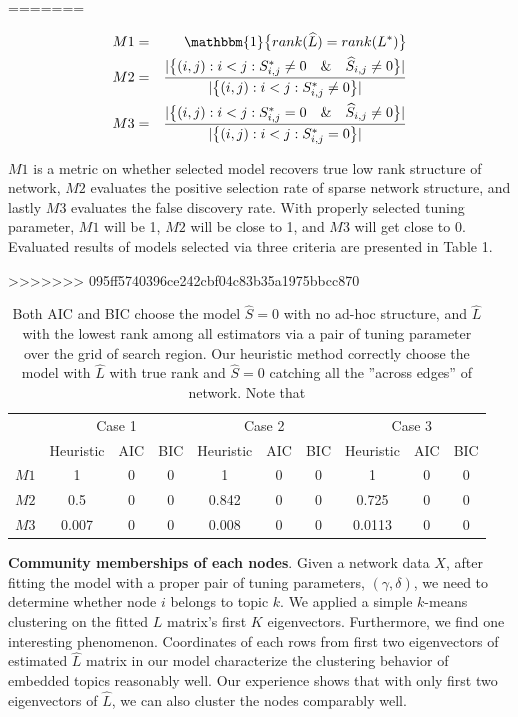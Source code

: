 \documentclass[AMS,STIX1COL]{WileyNJD-v2}
\begin{document}
=======

\begin{eqnarray*}
M1 &=& \mathbbm{1}\big\{rank(\widehat{L}) = rank(L^{*})\big\} \\
M2 &=& \frac{|\big\{(i,j):i<j:S^{*}_{i,j} \neq0 \quad \& \quad \widehat{S}_{i,j} \neq 0 \big\}|}{|\big\{(i,j):i<j:S^{*}_{i,j}\neq0\big\}|} \\
M3 &=& \frac{|\big\{(i,j):i<j:S^{*}_{i,j} = 0 \quad \& \quad \widehat{S}_{i,j} \neq 0 \big\}|}{|\big\{(i,j):i<j:S^{*}_{i,j}=0\big\}|}
\end{eqnarray*}

$M1$ is a metric on whether selected model recovers true low rank structure of network,
$M2$ evaluates the positive selection rate of sparse network structure,
and lastly $M3$ evaluates the false discovery rate.
With properly selected tuning parameter, $M1$ will be 1, $M2$ will be close to 1, and $M3$ will get close to 0.
Evaluated results of models selected via three criteria are presented in Table 1.

>>>>>>> 095ff5740396ce242cbf04c83b35a1975bbcc870
\begin{table}[htbp]
\centering
\begin{tabular}{c|ccc|ccc|ccc}
   & \multicolumn{3}{c|}{Case 1} & \multicolumn{3}{c|}{Case 2} & \multicolumn{3}{c}{Case 3} \\ \cline{2-10}
   & Heuristic        & AIC    & BIC    & Heuristic        & AIC    & BIC    & Heuristic        & AIC    & BIC   \\ \hline
$M1$ & 1         & 0      & 0      & 1         & 0      & 0      & 1         & 0      & 0     \\
$M2$ & 0.5       & 0      & 0      & 0.842     & 0      & 0      & 0.725     & 0      & 0     \\
$M3$ & 0.007     & 0      & 0      & 0.008     & 0      & 0      & 0.0113    & 0      & 0
\end{tabular}
\caption{ Both AIC and BIC choose the model $\widehat{S}=0$ with no ad-hoc structure, and $\widehat{L}$ with the lowest rank among all estimators via a pair of tuning parameter over the grid of search region. Our heuristic method correctly choose the model with $\widehat{L}$ with true rank and $\widehat{S}=0$ catching all the ''across edges'' of network. Note that }
\label{tab:table1}
\end{table}


\textbf{Community memberships of each nodes}.
Given a network data $X$, after fitting the model with a proper pair of tuning parameters, $(\gamma,\delta)$, we need to determine whether node $i$ belongs to topic $k$.
We applied a simple $k$-means clustering on the fitted $L$ matrix's first $K$ eigenvectors.
Furthermore, we find one interesting phenomenon.
Coordinates of each rows from first two eigenvectors of estimated $\widehat{L}$ matrix in our model characterize the clustering behavior of embedded topics reasonably well.
Our experience shows that with only first two eigenvectors of $\widehat{L}$, we can also cluster the nodes comparably well.
\end{document}
